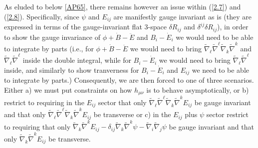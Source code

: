 As eluded to below \eqref{AP65}, there remains however an issue within (\ref{2.7}) and (\ref{2.8}). Specifically, since $\psi$ and $E_{ij}$ are manifestly gauge invariant as is (they are expressed in terms of the gauge-invariant flat 3-space $\delta R_{ij}$ and $\delta^{ij}\delta R_{ij}$), in order to show the gauge invariance of $\phi+\dot{B}-\ddot{E}$ and $B_i -\dot{E}_i$ we would need to be able to integrate by parts (i.e., for $\phi+\dot{B}-\ddot{E}$  we would need to bring $\tilde{\nabla}_{\ell}\tilde{\nabla}^{\ell} \tilde{\nabla}_k\tilde{\nabla}^k$ and $\tilde{\nabla}_{\ell}\tilde{\nabla}^{\ell}$ inside the double integral, while for $B_i-\dot{E}_i$ we would need to bring $\tilde{\nabla}_{\ell}\tilde{\nabla}^{\ell}$ inside, and similarly to show tranverness for $B_i -\dot{E}_i$ and $E_{ij}$ we need to be able to integrate by parts.) Consequently, we are then forced to one of three scenarios. Either a) we must put constraints on how $h_{\mu\nu}$ is to behave asymptotically, or b) restrict to requiring in the $E_{ij}$ sector that only $\tilde{\nabla}_{\ell}\tilde{\nabla}^{\ell}\tilde{\nabla}_k\tilde{\nabla}^kE_{ij}$ be gauge invariant and that only $\tilde{\nabla}_{\ell}\tilde{\nabla}^{\ell}\tilde{\nabla}_k\tilde{\nabla}^kE_{ij}$ be transverse or c) in the $E_{ij}$ plus $\psi$ sector restrict to requiring that only $\tilde{\nabla}_k\tilde{\nabla}^kE_{ij}-\delta_{ij}\tilde{\nabla}_k\tilde{\nabla}^k\psi-\tilde{\nabla}_i\tilde{\nabla}_j\psi$ be gauge invariant and that only $\tilde{\nabla}_k\tilde{\nabla}^kE_{ij}$ be transverse. 

